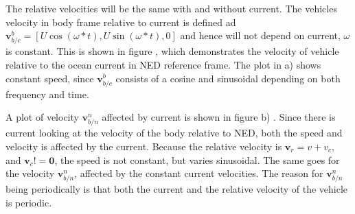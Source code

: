 The relative velocities will be the same with and without current. The vehicles velocity in body frame relative to current is defined ad $\mathbf{v}^b_{b/c} = [U \cos(\omega  *t), U \sin(\omega*t) , 0]$ and hence will not depend on current, $\omega$ is constant. This is shown in figure , which demonstrates the velocity of vehicle relative to the ocean current in NED reference frame. The plot in  a) shows constant speed, since $\mathbf{v}^b_{b/c}$ consists of a cosine and sinusoidal  depending on both frequency and time. 

A plot of velocity  $\mathbf{v}^n_{b/n}$ affected by current is shown in figure  b) . Since there is current   looking at the velocity of the body relative to NED, both the speed and velocity is  affected by the current. Because the relative velocity is $\mathbf{v}_r = v + v_c$, and $\mathbf{v}_c != \mathbf{0}$, the speed is not constant, but varies sinusoidal. The same goes for the velocity $\mathbf{v}^n_{b/n}$, affected by the constant current velocities. The reason for  $\mathbf{v}^n_{b/n}$ being periodically is that both the current and the relative velocity of the vehicle is periodic.


